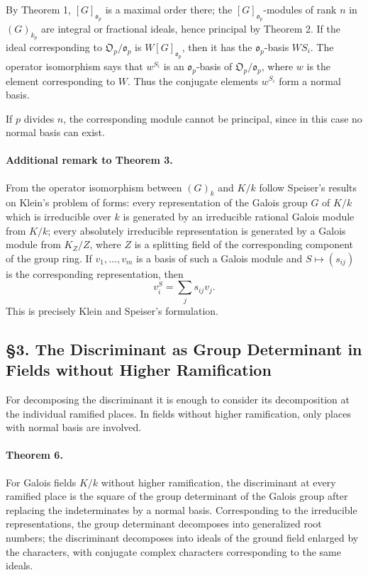 \documentclass[11pt]{article}
\providecommand{\frako}{\mathfrak o}
\providecommand{\frakO}{\mathfrak O}
\begin{document}
By Theorem 1, \([G]_{\frako_p}\) is a maximal order there; the \([G]_{\frako_p}\)-modules of rank \(n\) in \((G)_{k_p}\) are integral or fractional ideals, hence principal by Theorem 2. If the ideal corresponding to \(\frakO_p/\frako_p\) is \(W[G]_{\frako_p}\), then it has the \(\frako_p\)-basis \(WS_i\). The operator isomorphism says that \(w^{S_i}\) is an \(\frako_p\)-basis of \(\frakO_p/\frako_p\), where \(w\) is the element corresponding to \(W\). Thus the conjugate elements \(w^{S_i}\) form a normal basis.

If \(p\) divides \(n\), the corresponding module cannot be principal, since in this case no normal basis can exist.

\paragraph{Additional remark to Theorem 3.}
From the operator isomorphism between \((G)_k\) and \(K/k\) follow Speiser's results on Klein's problem of forms: every representation of the Galois group \(G\) of \(K/k\) which is irreducible over \(k\) is generated by an irreducible rational Galois module from \(K/k\); every absolutely irreducible representation is generated by a Galois module from \(K_Z/Z\), where \(Z\) is a splitting field of the corresponding component of the group ring. If \(v_1,\ldots,v_m\) is a basis of such a Galois module and \(S\mapsto (s_{ij})\) is the corresponding representation, then
\[
        v_i^S=\sum_j s_{ij}v_j.
\]
This is precisely Klein and Speiser's formulation.

\subsection*{§3. The Discriminant as Group Determinant in Fields without Higher Ramification}

For decomposing the discriminant it is enough to consider its decomposition at the individual ramified places. In fields without higher ramification, only places with normal basis are involved.

\paragraph{Theorem 6.}
For Galois fields \(K/k\) without higher ramification, the discriminant at every ramified place is the square of the group determinant of the Galois group after replacing the indeterminates by a normal basis. Corresponding to the irreducible representations, the group determinant decomposes into generalized root numbers; the discriminant decomposes into ideals of the ground field enlarged by the characters, with conjugate complex characters corresponding to the same ideals.
\end{document}
